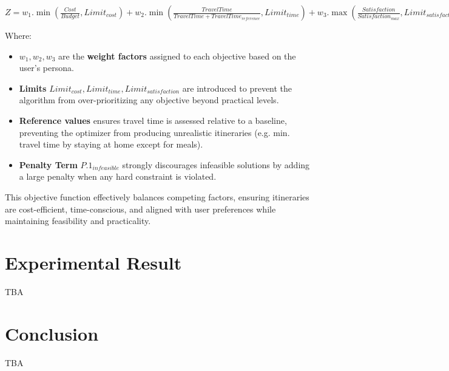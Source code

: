 \documentclass{ecai}
\begin{document}
$
Z = w_1 . \min (\frac{Cost}{Budget}, Limit_{cost}) + w_2 . \min (\frac{Travel Time}{Travel Time + TravelTime_{reference}}, Limit_{time}) + w_3 . \max (\frac{Satisfaction}{Satisfaction_{max}}, Limit_{satisfaction}) + P.1_{infeasible}
$

Where:
\begin{itemize}
    \item $w_1, w_2, w_3$ are the \textbf{weight factors} assigned to each objective based on the user’s persona.
    \item \textbf{Limits} $Limit_{cost}, Limit_{time}, Limit_{satisfaction}$ are introduced to prevent the algorithm from over-prioritizing any objective beyond practical levels.
    \item \textbf{Reference values} ensures travel time is assessed relative to a baseline, preventing the optimizer from producing unrealistic itineraries (e.g. min. travel time by staying at home except for meals).
    \item \textbf{Penalty Term} $P.1_{infeasible}$ strongly discourages infeasible solutions by adding a large penalty when any hard constraint is violated.
\end{itemize}

This objective function effectively balances competing factors, ensuring itineraries are cost-efficient, time-conscious, and aligned with user preferences while maintaining feasibility and practicality.

\section{Experimental Result}
TBA

\section{Conclusion}
TBA



\end{document}
